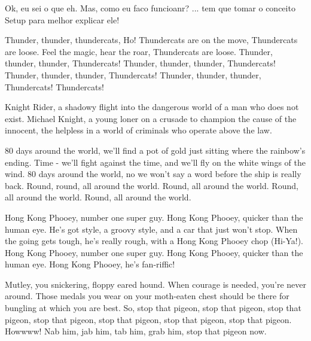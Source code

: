 Ok, eu sei o que eh.
Mas, como eu faco funcioanr?
... tem que tomar o conceito Setup para melhor explicar ele!

Thunder, thunder, thundercats, Ho! Thundercats are on the move, Thundercats are loose. Feel the magic, hear the roar, Thundercats are loose. Thunder, thunder, thunder, Thundercats! Thunder, thunder, thunder, Thundercats! Thunder, thunder, thunder, Thundercats! Thunder, thunder, thunder, Thundercats! Thundercats!

Knight Rider, a shadowy flight into the dangerous world of a man who does not exist. Michael Knight, a young loner on a crusade to champion the cause of the innocent, the helpless in a world of criminals who operate above the law.

80 days around the world, we'll find a pot of gold just sitting where the rainbow's ending. Time - we'll fight against the time, and we'll fly on the white wings of the wind. 80 days around the world, no we won't say a word before the ship is really back. Round, round, all around the world. Round, all around the world. Round, all around the world. Round, all around the world.

Hong Kong Phooey, number one super guy. Hong Kong Phooey, quicker than the human eye. He's got style, a groovy style, and a car that just won't stop. When the going gets tough, he's really rough, with a Hong Kong Phooey chop (Hi-Ya!). Hong Kong Phooey, number one super guy. Hong Kong Phooey, quicker than the human eye. Hong Kong Phooey, he's fan-riffic!

Mutley, you snickering, floppy eared hound. When courage is needed, you're never around. Those medals you wear on your moth-eaten chest should be there for bungling at which you are best. So, stop that pigeon, stop that pigeon, stop that pigeon, stop that pigeon, stop that pigeon, stop that pigeon, stop that pigeon. Howwww! Nab him, jab him, tab him, grab him, stop that pigeon now.

